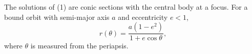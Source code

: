 The solutions of (1) are conic sections with the central body at a focus.
For a bound orbit with semi-major axis $a$ and eccentricity $e < 1$,
\begin{equation}
  r(\theta) = \frac{a(1-e^2)}{1 + e\cos\theta},
\end{equation}
where $\theta$ is measured from the periapsis.
